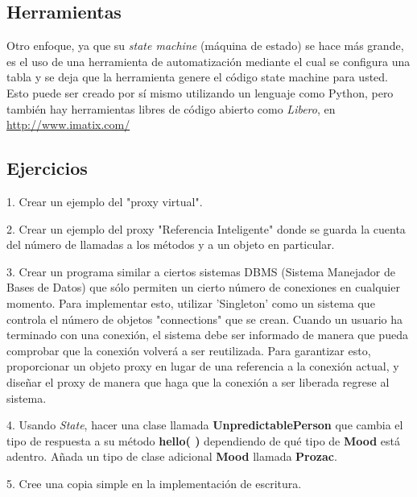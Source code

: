 \subsection*{Herramientas}
\label{subsec:Herramientas}

Otro enfoque, ya que su \textit{state machine} (máquina de estado) se hace más grande, es el uso de una herramienta de automatización mediante el cual se configura una tabla y se deja que la herramienta genere el código state machine para usted. Esto puede ser creado por sí mismo utilizando un lenguaje como Python, pero también hay herramientas libres de código abierto como \textit{Libero}, en \url{http://www.imatix.com/} \newline 


\subsection*{Ejercicios}
\label{subsec:Ejercicios}

1. Crear un ejemplo del "proxy virtual". \newline

2. Crear un ejemplo del proxy "Referencia Inteligente" donde se guarda la cuenta del número de llamadas a los métodos y a un objeto en particular. \newline

3. Crear un programa similar a ciertos sistemas DBMS (Sistema Manejador de Bases de Datos) que sólo permiten un cierto número de conexiones en cualquier momento. Para implementar esto, utilizar 'Singleton' como un sistema que controla el número de objetos "connections" que se crean. Cuando un usuario ha terminado con una conexión, el sistema debe ser informado de manera que pueda comprobar que la conexión volverá a ser reutilizada. Para garantizar esto, proporcionar un objeto proxy en lugar de una referencia a la conexión actual, y diseñar el proxy de manera que haga que la conexión a ser liberada regrese al sistema.   \newline

4. Usando \textit{State}, hacer una clase llamada \textbf{UnpredictablePerson} que cambia el tipo de respuesta a su método \textbf{hello( )} dependiendo de qué tipo de \textbf{Mood} está adentro. Añada un tipo de clase adicional \textbf{Mood} llamada \textbf{Prozac}.  \newline

5. Cree una copia simple en la implementación de escritura.   \newline

